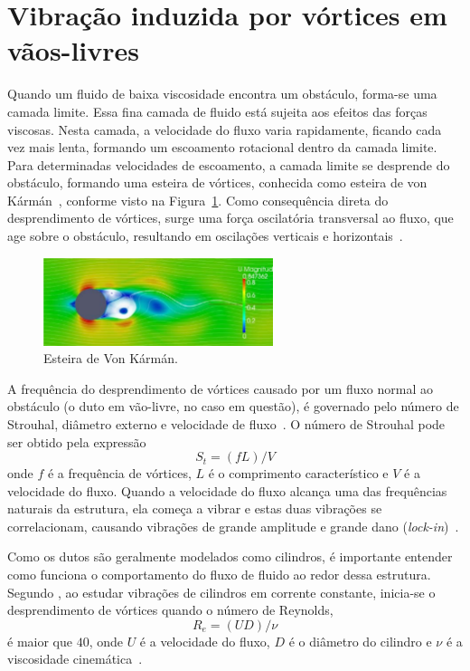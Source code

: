 \section{Vibração induzida por vórtices em vãos-livres}\label{sec:viv}

Quando um fluido de baixa viscosidade encontra um obstáculo, forma-se uma camada limite.
Essa fina camada de fluido está sujeita aos efeitos das forças viscosas.
Nesta camada, a velocidade do fluxo varia rapidamente, ficando cada vez mais lenta, formando um escoamento rotacional dentro da camada limite.
Para determinadas velocidades de escoamento, a camada limite se desprende do obstáculo, formando uma esteira de vórtices, conhecida como esteira de von Kármán~\cite{Currie2002}, conforme visto na Figura~\ref{fig:viv_shading}.
Como consequência direta do desprendimento de vórtices, surge uma força oscilatória transversal ao fluxo, que age sobre o obstáculo, resultando em oscilações verticais e horizontais~\cite{Nielsen2002}.

\begin{figure}[!ht]
    \centering
    \caption{Esteira de Von Kármán.}\label{fig:viv_shading}
    \includegraphics[width=0.6\textwidth]{imagens/viv_shading}
\end{figure}

A frequência do desprendimento de vórtices causado por um fluxo normal ao obstáculo (o duto em vão-livre, no caso em questão), é governado pelo número de Strouhal, diâmetro externo e velocidade de fluxo~\cite{Mork2003}.
O número de Strouhal pode ser obtido pela expressão
\begin{equation}
    S_t = (f L) / V
\end{equation}
onde $f$ é a frequência de vórtices, $L$ é o comprimento característico e $V$ é a velocidade do fluxo.
Quando a velocidade do fluxo alcança uma das frequências naturais da estrutura, ela começa a vibrar e estas duas vibrações se correlacionam, causando vibrações de grande amplitude e grande dano (\textit{lock-in})~\cite{Mork2003}.

Como os dutos são geralmente modelados como cilindros, é importante entender como funciona o comportamento do fluxo de fluido ao redor dessa estrutura. Segundo , ao estudar vibrações de cilindros em corrente constante, inicia-se o desprendimento de vórtices quando o número de Reynolds,
\begin{equation}
    R_e = (U D)/\nu
\end{equation}
é maior que $40$, onde $U$ é a velocidade do fluxo, $D$ é o diâmetro do cilindro e $\nu$ é a viscosidade cinemática~\cite{Sumer1995}.

